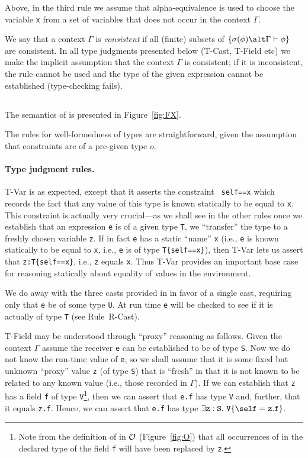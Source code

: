\noindent Above, in the third rule we assume that alpha-equivalence is used to
choose the variable {\tt x} from a set of variables that does not
occur in the context $\Gamma$.

We say that a context $\Gamma$ is {\em consistent} if all (finite)
subsets of $\{\sigma(\phi)\alt \Gamma \vdash \phi\}$ are consistent.
In all type judgments presented below ({\sc T-Cast}, {\sc T-Field}
etc) we make the implicit assumption that the context $\Gamma$ is
consistent; if it is inconsistent, the rule cannot be used and the
type of the given expression cannot be established (type-checking
fails).

\subsection{\FXZ}
The semantics of \FXZ{} is presented in Figure~\ref{fig:FX}. 

The rules for well-formedness of types are straightforward, given 
the assumption that constraints are of a pre-given type $o$.

\paragraph{Type judgment rules.}
{\sc T-Var} is as expected, except that it asserts the constraint {\tt
self==x} which records the fact that any value of this type is known
statically to be equal to {\tt x}. This constraint is actually very
crucial---as we shall see in the other rules once we establish that
an expression {\tt e} is of a given type {\tt T}, we ``transfer'' the
type to a freshly chosen variable {\tt z}. If in fact {\tt e} has a
static ``name'' {\tt x} (i.e., {\tt e} is known statically to be
equal to {\tt x}, i.e., {\tt e} is of type {\tt T\{self==x\}}), then
{\sc T-Var} lets us assert that {\tt z:T\{self==x\}}, i.e., {\tt z}
equals {\tt x}. Thus {\sc T-Var} provides an important base case for
reasoning statically about equality of values in the environment.

We do away with the three casts provided in\FJ{} in favor of a single
cast, requiring only that {\tt e} be of some type {\tt U}. At run time
{\tt e} will be checked to see if it is actually of type {\tt T} (see
Rule~{\sc R-Cast}).

{\sc T-Field} may be understood through ``proxy'' reasoning as
follows.  Given the context $\Gamma$ assume the receiver {\tt e} can
be established to be of type {\tt S}. Now we do not know the run-time
value of {\tt e}, so we shall assume that it is some fixed but unknown
``proxy'' value {\tt z} (of type {\tt S}) that is ``fresh'' in that it
is not known to be related to any known value (i.e., those recorded
in $\Gamma$).  If we can establish that {\tt z} has a field {\tt f} of
type {\tt V}\footnote{Note from the definition of
\fields{} in ${\cal O}$ (Figure~\ref{fig:O}) that all occurrences of
\this{} in the declared type of the field {\tt f} will have been replaced
by {\tt z}.}, then we can assert that
{\tt e.f} has type {\tt V} and, further, that it equals {\tt z.f}.
Hence, we can assert that {\tt e.f} has type 
$\exists {\tt z}:{\tt S}.~{\tt V}\{\self={\tt z}.{\tt f}\}$.

